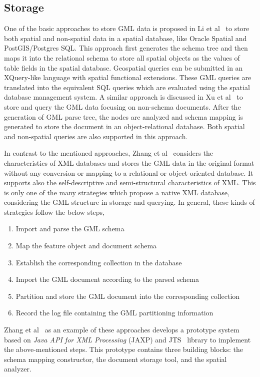 \documentclass[a4paper,12pt]{article}
\begin{document}
\subsection{Storage}
\label{storage}
One of the basic approaches to store GML data is proposed in Li et al~\cite{Li2004} to store both spatial and non-spatial data in a spatial database, like Oracle Spatial and PostGIS/Postgres SQL. This approach first generates the schema tree and then maps it into the relational schema to store all spatial objects as the values of table fields in the spatial database. Geospatial queries can be submitted 
in an XQuery-like language with spatial functional extensions. These GML queries are translated into the equivalent SQL queries which are evaluated using the spatial database management system. 
A similar approach is discussed in Xu et al~\cite{Zhu2011} to store and query the GML data focusing on non-schema documents. After the generation of GML parse tree, the nodes are analyzed and schema mapping is generated to store the document in an object-relational database. 
Both spatial and non-spatial queries are also supported in this approach.

In contrast to the mentioned approaches, Zhang et al~\cite{Zhang2008} considers the characteristics of XML databases and stores the GML data in the original format without any conversion or mapping to a relational or object-oriented database. 
It supports also the self-descriptive and semi-structural characteristics of XML.
This is only one of the many strategies which propose a native XML database, considering the GML structure in storage and querying. 
In general, these kinds of strategies follow the below steps,
\begin{enumerate}
\item Import and parse the GML schema
\item Map the feature object and document schema
\item Establish the corresponding collection in the database
\item Import the GML document according to the parsed schema
\item Partition and store the GML document into the corresponding collection
\item Record the log file containing the GML partitioning information
\end{enumerate}
Zhang et al~\cite{Zhang2008} as an example of these approaches develops a prototype system based on \textit{Java API for XML Processing} (JAXP) and JTS~\cite{jts} library to implement the above-mentioned steps. 
This prototype contains three building blocks: the schema mapping constructor, the document storage tool, 
and the spatial analyzer.
\end{document}
